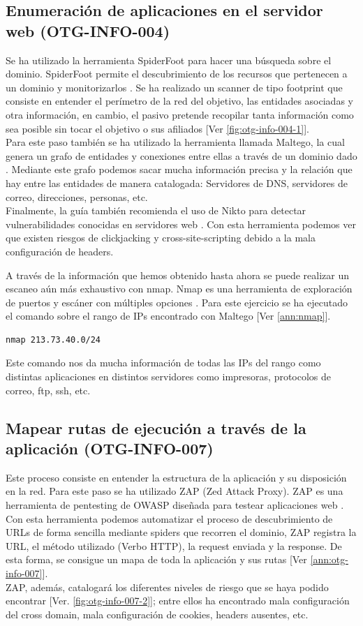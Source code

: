 \documentclass[10pt,a4paper]{article}
\begin{document}
\subsection{Enumeración de aplicaciones en el servidor web (OTG-INFO-004)}
Se ha utilizado la herramienta SpiderFoot para hacer una búsqueda sobre el dominio. SpiderFoot permite el descubrimiento de los recursos que pertenecen a un dominio y monitorizarlos \cite{spiderfoot}. Se ha realizado un scanner de tipo footprint que consiste en entender el perímetro de la red del objetivo, las entidades asociadas y otra información, en cambio, el pasivo pretende recopilar tanta información como sea posible sin tocar el objetivo o sus afiliados [Ver \ref{fig:otg-info-004-1}].\\
Para este paso también se ha utilizado la herramienta llamada Maltego, la cual genera un grafo de entidades y conexiones entre ellas a través de un dominio dado \cite{maltego}. Mediante este grafo podemos sacar mucha información precisa y la relación que hay entre las entidades de manera catalogada: Servidores de DNS, servidores de correo, direcciones, personas, etc.\\
Finalmente, la guía también recomienda el uso de Nikto para detectar vulnerabilidades conocidas en servidores web \cite{nikto}. Con esta herramienta podemos ver que existen riesgos de clickjacking y cross-site-scripting debido a la mala configuración de headers.

A través de la información que hemos obtenido hasta ahora se puede realizar un escaneo aún más exhaustivo con nmap. Nmap es una herramienta de exploración de puertos y escáner con múltiples opciones \cite{nmap}. Para este ejercicio se ha ejecutado el comando sobre el rango de IPs encontrado con Maltego [Ver \ref{ann:nmap}].
\begin{lstlisting}
nmap 213.73.40.0/24
\end{lstlisting}
Este comando nos da mucha información de todas las IPs del rango como distintas aplicaciones en distintos servidores como impresoras, protocolos de correo, ftp, ssh, etc.

\subsection{Mapear rutas de ejecución a través de la aplicación (OTG-INFO-007)}
Este proceso consiste en entender la estructura de la aplicación y su disposición en la red. Para este paso se ha utilizado ZAP (Zed Attack Proxy). ZAP es una herramienta de pentesting de OWASP diseñada para testear aplicaciones web \cite{zap}.
Con esta herramienta podemos automatizar el proceso de descubrimiento de URLs de forma sencilla mediante spiders que recorren el dominio, ZAP registra la URL, el método utilizado (Verbo HTTP), la request enviada y la response. De esta forma, se consigue un mapa de toda la aplicación y sus rutas [Ver \ref{ann:otg-info-007}].\\
ZAP, además, catalogará los diferentes niveles de riesgo que se haya podido encontrar [Ver. \ref{fig:otg-info-007-2}]; entre ellos ha encontrado mala configuración del cross domain, mala configuración de cookies, headers ausentes, etc.
\end{document}
